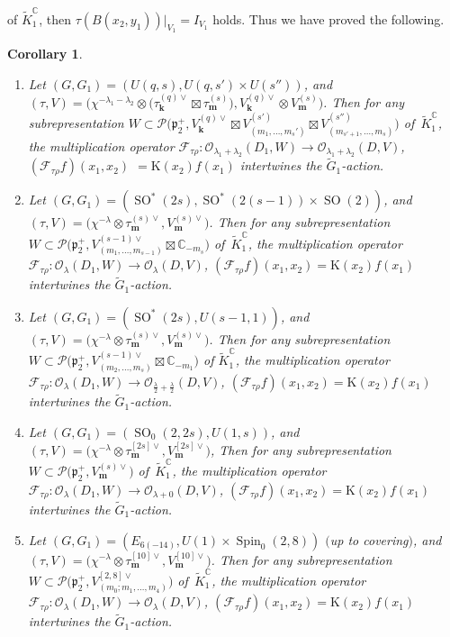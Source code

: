 \documentclass[pdftex]{sigma}
\numberwithin{equation}{section}
\newtheorem{Corollary}[Theorem]{Corollary}
\newcommand{\bk}{\mathbf{k}}
\newcommand{\bm}{\mathbf{m}}
\newcommand{\BC}{\mathbb{C}}
\newcommand{\fp}{\mathfrak{p}}
\newcommand{\cF}{\mathcal{F}}
\newcommand{\cO}{\mathcal{O}}
\newcommand{\cP}{\mathcal{P}}
\newcommand{\rK}{\mathrm{K}}
\begin{document}
of $\tilde{K}^\BC_1$, then $\tau(B(x_2,y_1))|_{V_1}=I_{V_1}$ holds.
Thus we have proved the following.
\begin{Corollary}\label{normal_der_2}\quad
\begin{enumerate}\itemsep=0pt
\item[$(1)$] Let $(G,G_1)=(U(q,s),U(q,s')\times U(s''))$,
and $(\tau,V)=\big(\chi^{-\lambda_1-\lambda_2}\otimes\big(\tau_\bk^{(q)\vee}\boxtimes \tau_\bm^{(s)}\big),V_\bk^{(q)\vee}\otimes V_\bm^{(s)}\big)$.
Then for any subrepresentation $W\subset\cP\big(\fp^+_2,V_\bk^{(q)\vee}\boxtimes V_{(m_1,\ldots,m_s')}^{(s')}
\boxtimes V_{(m_{s'+1},\ldots,m_{s})}^{(s'')}\big)$ of~$\tilde{K}^\BC_1$, the multiplication operator
$\cF_{\tau\rho}\colon \cO_{\lambda_1+\lambda_2}(D_1,W)\to\cO_{\lambda_1+\lambda_2}(D,V)$, $(\cF_{\tau\rho}f)(x_1,x_2)$ $=\rK(x_2)f(x_1)$ intertwines the $\tilde{G}_1$-action.
\item[$(2)$] Let $(G,G_1)=(\operatorname{SO}^*(2s),\operatorname{SO}^*(2(s-1))\times \operatorname{SO}(2))$,
and $(\tau,V)=\big(\chi^{-\lambda}\otimes\tau_\bm^{(s)\vee},V_\bm^{(s)\vee}\big)$.
Then for any subrepresentation $W\subset\cP\big(\fp^+_2,V_{(m_1,\ldots,m_{s-1})}^{(s-1)\vee}\boxtimes \BC_{-m_s}\big)$ of~$\tilde{K}^\BC_1$,
the multiplication operator
$\cF_{\tau\rho}\colon \cO_\lambda(D_1,W)\to\cO_\lambda(D,V)$, $(\cF_{\tau\rho}f)(x_1,x_2)=\rK(x_2)f(x_1)$ intertwines the $\tilde{G}_1$-action.
\item[$(3)$] Let $(G,G_1)=(\operatorname{SO}^*(2s),U(s-1,1))$,
and $(\tau,V)=\big(\chi^{-\lambda}\otimes\tau_\bm^{(s)\vee},V_\bm^{(s)\vee}\big)$.
Then for any subrepresentation $W\subset\cP\big(\fp^+_2,V_{(m_2,\ldots,m_s)}^{(s-1)\vee}\boxtimes \BC_{-m_1}\big)$ of $\tilde{K}^\BC_1$,
the multiplication operator
$\cF_{\tau\rho}\colon \cO_\lambda(D_1,W)\to\cO_{\frac{\lambda}{2}+\frac{\lambda}{2}}(D,V)$,
$(\cF_{\tau\rho}f)(x_1,x_2)=\rK(x_2)f(x_1)$ intertwines the $\tilde{G}_1$-action.
\item[$(4)$] Let $(G,G_1)=(\operatorname{SO}_0(2,2s),U(1,s))$, and $(\tau,V)=\big(\chi^{-\lambda}\otimes \tau_\bm^{[2s]\vee},V_\bm^{[2s]\vee}\big)$,
Then for any subrepresentation $W\subset\cP\big(\fp^+_2,V_\bm^{(s)\vee}\big)$ of~$\tilde{K}^\BC_1$,
the multiplication operator $\cF_{\tau\rho}\colon \cO_\lambda(D_1,W)\to\cO_{\lambda+0}(D,V)$, $(\cF_{\tau\rho}f)(x_1,x_2)=\rK(x_2)f(x_1)$ intertwines the $\tilde{G}_1$-action.
\item[$(5)$] Let $(G,G_1)=(E_{6(-14)},U(1)\times \operatorname{Spin}_0(2,8))$ $($up to covering$)$,
and $(\tau,V)=\big(\chi^{-\lambda}\otimes \tau_{\bm}^{[10]\vee},\allowbreak V_{\bm}^{[10]\vee}\big)$.
Then for any subrepresentation $W\subset\cP\big(\fp^+_2,V_{(m_0;m_1,\ldots,m_4)}^{[2,8]\vee}\big)$ of~$\tilde{K}^\BC_1$,
the multiplication operator $\cF_{\tau\rho}\colon \cO_\lambda(D_1,W)\to\cO_\lambda(D,V)$, $(\cF_{\tau\rho}f)(x_1,x_2)=\rK(x_2)f(x_1)$ intertwines the $\tilde{G}_1$-action.
\end{enumerate}
\end{Corollary}
\end{document}
